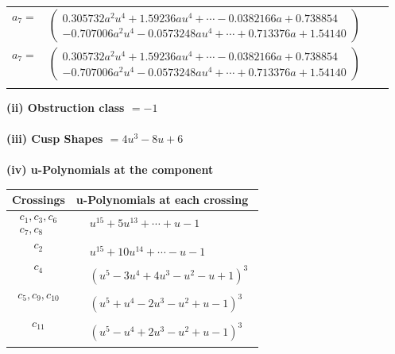 \documentclass[1p]{elsarticle_modified}
\theoremstyle{definition}
\begin{document}
\begin{tabular}{m{7pt} m{180pt} m{7pt} m{180pt} }
\flushright $a_{7}=$&$\begin{pmatrix}0.305732 a^{2} u^{4}+1.59236 a u^{4}+\cdots-0.0382166 a+0.738854\\-0.707006 a^{2} u^{4}-0.0573248 a u^{4}+\cdots+0.713376 a+1.54140\end{pmatrix}$\\ \flushright $a_{7}=$&$\begin{pmatrix}0.305732 a^{2} u^{4}+1.59236 a u^{4}+\cdots-0.0382166 a+0.738854\\-0.707006 a^{2} u^{4}-0.0573248 a u^{4}+\cdots+0.713376 a+1.54140\end{pmatrix}$\\&\end{tabular}
\flushleft \textbf{(ii) Obstruction class $= -1$}\\~\\
\flushleft \textbf{(iii) Cusp Shapes $= 4 u^3-8 u+6$}\\~\\
\newpage\renewcommand{\arraystretch}{1}
\flushleft \textbf{(iv) u-Polynomials at the component}\newline \\
\begin{tabular}{m{50pt}|m{274pt}}
Crossings & \hspace{64pt}u-Polynomials at each crossing \\
\hline $$\begin{aligned}c_{1},c_{3},c_{6}\\c_{7},c_{8}\end{aligned}$$&$\begin{aligned}
&u^{15}+5 u^{13}+\cdots+u-1
\end{aligned}$\\
\hline $$\begin{aligned}c_{2}\end{aligned}$$&$\begin{aligned}
&u^{15}+10 u^{14}+\cdots- u-1
\end{aligned}$\\
\hline $$\begin{aligned}c_{4}\end{aligned}$$&$\begin{aligned}
&(u^5-3 u^4+4 u^3- u^2- u+1)^3
\end{aligned}$\\
\hline $$\begin{aligned}c_{5},c_{9},c_{10}\end{aligned}$$&$\begin{aligned}
&(u^5+u^4-2 u^3- u^2+u-1)^3
\end{aligned}$\\
\hline $$\begin{aligned}c_{11}\end{aligned}$$&$\begin{aligned}
&(u^5- u^4+2 u^3- u^2+u-1)^3
\end{aligned}$\\
\hline
\end{tabular}\\~\\
\end{document}
